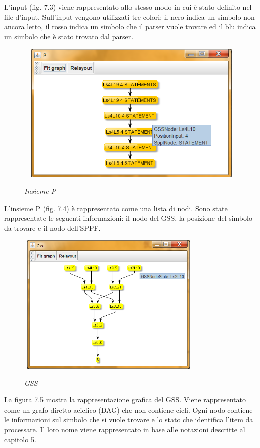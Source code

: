 \noindent L'input (fig. 7.3) viene rappresentato allo stesso modo in cui è stato definito nel file d'input. Sull'input vengono utilizzati tre colori: il nero indica un simbolo non ancora letto, il rosso indica un simbolo che il parser vuole trovare ed il blu indica un simbolo che è stato trovato dal parser.\par
\begin{figure}[hbpb]\label{insiemeP}
	\centering
	{\includegraphics[height=190pt,width=320pt,scale=0.1]{files/InsiemeP.png}}
	\caption{\textit{Insieme P}}
\end{figure}
\noindent L'insieme P (fig. 7.4) è rappresentato come una lista di nodi. Sono state rappresentate le seguenti informazioni: il nodo del GSS, la posizione del simbolo da trovare e il nodo dell'SPPF.\par
\begin{figure}[hbpb]\label{gss}
	\centering
	{\includegraphics[height=190pt,width=250pt,scale=0.1]{files/GSS.png}}
	\caption{\textit{GSS}}
\end{figure}
\noindent La figura 7.5 mostra la rappresentazione grafica del GSS. Viene rappresentato come un grafo diretto aciclico (DAG) che non contiene cicli. Ogni nodo contiene le informazioni sul simbolo che si vuole trovare e lo stato che identifica l'item da processare. Il loro nome viene rappresentato in base alle notazioni descritte al capitolo 5.\par
